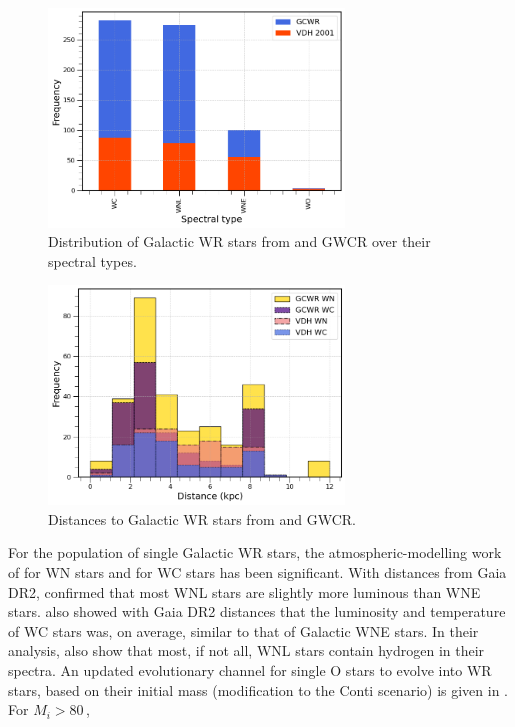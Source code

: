 \begin{figure}
    \centering
    \includegraphics[width=0.7\textwidth]{chapters/introduction/image/spt_dist.png}
    \caption{Distribution of Galactic WR stars from  and GWCR over their spectral types.}
    \label{fig:dist_spt}
\end{figure}



\begin{figure}
    \centering
    \includegraphics[width=0.7\textwidth]{chapters/introduction/image/dist_dist.png}
    \caption{Distances to Galactic WR stars from  and GWCR.}
    \label{fig:dist_dist}
\end{figure}

For the population of single Galactic WR stars, the atmospheric-modelling work of \citet{hamann_galactic_2019} for WN stars and \citet{sander_galactic_2019} for WC stars has been significant. With distances from Gaia DR2, \citet{hamann_galactic_2019} confirmed that most WNL stars are slightly more luminous than WNE stars. \citet{sander_galactic_2019} also showed with Gaia DR2 distances that the luminosity and temperature of WC stars was, on average, similar to that of Galactic WNE stars. In their analysis, \citet{hamann_galactic_2019} also show that most, if not all, WNL stars contain hydrogen in their spectra. An updated evolutionary channel for single O stars to evolve into WR stars, based on their initial mass (modification to the Conti scenario) is given in \citet{sander_galactic_2019}. For $M_i > 80\,$\Msun{},

